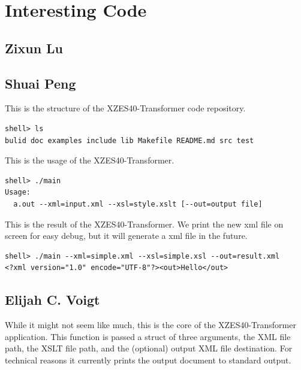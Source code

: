 \section{Interesting Code}

\subsection{Zixun Lu}

\subsection{Shuai Peng}

This is the structure of the XZES40-Transformer code repository.

\begin{lstlisting}
shell> ls
bulid doc examples include lib Makefile README.md src test
\end{lstlisting}

This is the usage of the XZES40-Transformer.

\begin{lstlisting}
shell> ./main
Usage:
  a.out --xml=input.xml --xsl=style.xslt [--out=output file]
\end{lstlisting}

This is the result of the XZES40-Transformer. We print the new xml file on screen for easy debug, but it will generate a xml file in the future.

\begin{lstlisting}
shell> ./main --xml=simple.xml --xsl=simple.xsl --out=result.xml
<?xml version="1.0" encode="UTF-8"?><out>Hello</out>
\end{lstlisting}

\subsection{Elijah C. Voigt}

While it might not seem like much, this is the core of the XZES40-Transformer application.
This function is passed a struct of three arguments, the XML file path, the XSLT file path, and the (optional) output XML file destination.
For technical reasons it currently prints the output document to standard output.

